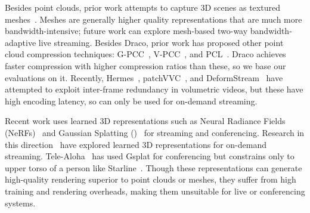 %
Besides point clouds, prior work attempts to capture 3D scenes as textured meshes~\cite{kinectfusion,fvv,holoportation,fusion4d,dynamic-fusion,meshreduce}.
%
%
Meshes are generally higher quality representations that are much more bandwidth-intensive; future work can explore mesh-based two-way bandwidth-adaptive live streaming.
%
Besides Draco, prior work has proposed other point cloud compression techniques: G-PCC~\cite{gpcc}, V-PCC~\cite{vpcc}, and PCL~\cite{pcl}. 
%
Draco achieves faster compression with higher compression ratios than these, so we base our evaluations on it.
%
Recently, Hermes~\cite{hermes}, patchVVC~\cite{patchvvc}, and DeformStream~\cite{deformstream} have attempted to exploit inter-frame redundancy in volumetric videos, but these have high encoding latency, so can only be used for on-demand streaming.

Recent work uses learned 3D representations such as Neural Radiance Fields (NeRFs)~\cite{nerf} and Gaussian Splatting (\gs)~\cite{gsplat} for streaming and conferencing.
%
%
Research in this direction~\cite{nerf-nossdav, nerf-ems1, mga, swings, telepresence-tvcg, 3dgstream, queen, streamrf} have explored learned 3D representations for on-demand streaming. 
%
Tele-Aloha~\cite{tele-aloha} has used Gsplat for conferencing but constrains only to upper torso of a person like Starline~\cite{starline}.
%
Though these representations can generate high-quality rendering superior to point clouds or meshes, they suffer from high training and rendering overheads, making them unsuitable for live or conferencing systems. 
%
%

